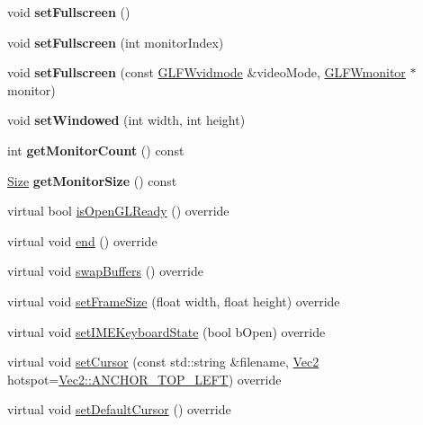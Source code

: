 \begin{DoxyCompactItemize}
void {\bfseries set\+Fullscreen} ()
\item 
\mbox{\label{classGLViewImpl_ade4cc38e4105851d3a0ba945e8a5e9b4}} 
void {\bfseries set\+Fullscreen} (int monitor\+Index)
\item 
\mbox{\label{classGLViewImpl_abfcad8fe542be976741db7a14522adf1}} 
void {\bfseries set\+Fullscreen} (const \hyperlink{structGLFWvidmode}{G\+L\+F\+Wvidmode} \&video\+Mode, \hyperlink{group__monitor_ga8d9efd1cde9426692c73fe40437d0ae3}{G\+L\+F\+Wmonitor} $\ast$monitor)
\item 
\mbox{\label{classGLViewImpl_afd53fd01418f4ce7caefa7e3c174dcb8}} 
void {\bfseries set\+Windowed} (int width, int height)
\item 
\mbox{\label{classGLViewImpl_a19a822acad8776285ede14db9dc3716c}} 
int {\bfseries get\+Monitor\+Count} () const
\item 
\mbox{\label{classGLViewImpl_ae79928359ee68b2b4009f433d602a68e}} 
\hyperlink{classSize}{Size} {\bfseries get\+Monitor\+Size} () const
\item 
virtual bool \hyperlink{classGLViewImpl_af539e58d1d28db65ba47f107c9c801d7}{is\+Open\+G\+L\+Ready} () override
\item 
virtual void \hyperlink{classGLViewImpl_ab5a08a3ea92598cdabbed94686eed58a}{end} () override
\item 
virtual void \hyperlink{classGLViewImpl_ab434675d26eb367ae74f9533c34d2ca7}{swap\+Buffers} () override
\item 
virtual void \hyperlink{classGLViewImpl_a16286e087255bfe27d0bef183761eaa0}{set\+Frame\+Size} (float width, float height) override
\item 
virtual void \hyperlink{classGLViewImpl_a37e04acaf52f6258ebe98d6b36c3b6c3}{set\+I\+M\+E\+Keyboard\+State} (bool b\+Open) override
\item 
virtual void \hyperlink{classGLViewImpl_a80189f01cb7314cd79fb37ccc5a1d779}{set\+Cursor} (const std\+::string \&filename, \hyperlink{classVec2}{Vec2} hotspot=\hyperlink{classVec2_ab0533215e446e0381d01bf49edd7ab7c}{Vec2\+::\+A\+N\+C\+H\+O\+R\+\_\+\+T\+O\+P\+\_\+\+L\+E\+FT}) override
\item 
virtual void \hyperlink{classGLViewImpl_afdb494137883635527117299e81cd78d}{set\+Default\+Cursor} () override

\end{DoxyCompactItemize}

